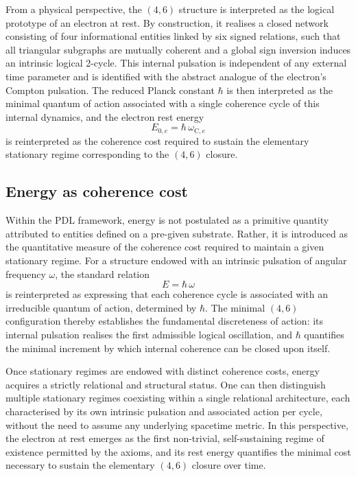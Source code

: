 \documentclass[12pt,a4paper]{article}
\begin{document}
From a physical perspective, the \((4,6)\) structure is interpreted as the logical prototype of an electron at rest.\cite{Laubscher2026PDL_English,Laubscher2026LDP_French}
By construction, it realises a closed network consisting of four informational entities linked by six signed relations, such that all triangular subgraphs are mutually coherent and a global sign inversion induces an intrinsic logical 2-cycle.
This internal pulsation is independent of any external time parameter and is identified with the abstract analogue of the electron’s Compton pulsation.
The reduced Planck constant \(\hbar\) is then interpreted as the minimal quantum of action associated with a single coherence cycle of this internal dynamics, and the electron rest energy
\[
  E_{0,e} = \hbar\,\omega_{\text{C},e}
\]
is reinterpreted as the coherence cost required to sustain the elementary stationary regime corresponding to the \((4,6)\) closure.

\subsection{Energy as coherence cost}

Within the PDL framework, energy is not postulated as a primitive quantity attributed to entities defined on a pre-given substrate.
Rather, it is introduced as the quantitative measure of the coherence cost required to maintain a given stationary regime.\cite{Laubscher2026IntroPDL,Laubscher2026PDL_English}
For a structure endowed with an intrinsic pulsation of angular frequency \(\omega\), the standard relation
\[
  E = \hbar\,\omega
\]
is reinterpreted as expressing that each coherence cycle is associated with an irreducible quantum of action, determined by \(\hbar\).
The minimal \((4,6)\) configuration thereby establishes the fundamental discreteness of action: its internal pulsation realises the first admissible logical oscillation, and \(\hbar\) quantifies the minimal increment by which internal coherence can be closed upon itself.

Once stationary regimes are endowed with distinct coherence costs, energy acquires a strictly relational and structural status.
One can then distinguish multiple stationary regimes coexisting within a single relational architecture, each characterised by its own intrinsic pulsation and associated action per cycle, without the need to assume any underlying spacetime metric.
In this perspective, the electron at rest emerges as the first non-trivial, self-sustaining regime of existence permitted by the axioms, and its rest energy quantifies the minimal cost necessary to sustain the elementary \((4,6)\) closure over time.\cite{Laubscher2026PDL_English,Laubscher2026LDP_French}
\end{document}
